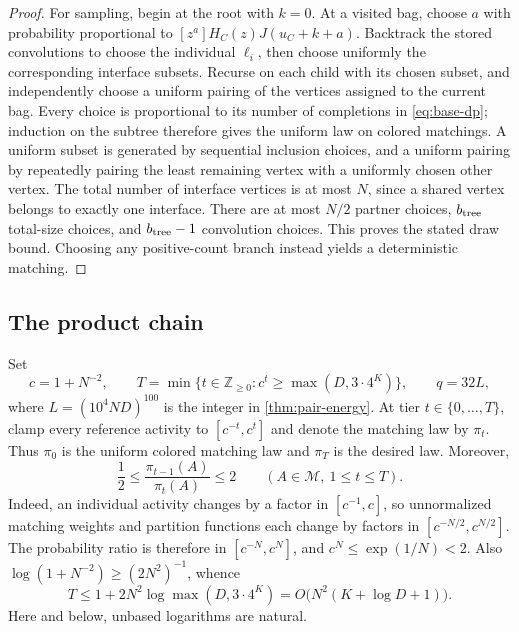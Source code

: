 \documentclass[11pt]{article}
\theoremstyle{definition}
\theoremstyle{remark}
\newcommand{\calM}{\mathcal M}
\numberwithin{equation}{section}
\begin{document}
\begin{proof}
For sampling, begin at the root with $k=0$. At a visited bag, choose
$a$ with probability proportional to $[z^a]H_C(z)J(u_C+k+a)$.
Backtrack the stored convolutions to choose the individual $\ell_i$,
then choose uniformly the corresponding interface subsets. Recurse
on each child with its chosen subset, and independently choose a
uniform pairing of the vertices assigned to the current bag. Every
choice is proportional to its number of completions in
\cref{eq:base-dp}; induction on the subtree therefore gives the
uniform law on colored matchings.
A uniform subset is generated by sequential inclusion choices, and a
uniform pairing by repeatedly pairing the least remaining vertex
with a uniformly chosen other vertex. The total number of interface
vertices is at most $N$, since a shared vertex belongs to exactly one
interface. There are at most $N/2$ partner choices, $b_{\rm tree}$ total-size
choices, and $b_{\rm tree}-1$ convolution choices. This proves the stated draw bound. Choosing any
positive-count branch instead yields a deterministic matching.
\end{proof}

\subsection{The product chain}

Set
\begin{equation}\label{eq:ladder-parameters}
 c=1+N^{-2},\qquad
 T=\min\{t\in\mathbb Z_{\ge0}:c^t\ge\max(D,3\cdot4^K)\},
 \qquad q=32L,
\end{equation}
where $L=(10^4ND)^{100}$ is the integer in
\cref{thm:pair-energy}. At tier $t\in\{0,\ldots,T\}$, clamp every
reference activity to $[c^{-t},c^t]$ and denote the matching law by
$\pi_t$. Thus $\pi_0$ is the uniform colored matching law and
$\pi_T$ is the desired law. Moreover,
\begin{equation}\label{eq:adjacent-density}
 \frac12\le\frac{\pi_{t-1}(A)}{\pi_t(A)}\le2
 \qquad(A\in\calM,\ 1\le t\le T).
\end{equation}
Indeed, an individual activity changes by a factor in $[c^{-1},c]$,
so unnormalized matching weights and partition functions each change
by factors in $[c^{-N/2},c^{N/2}]$. The probability ratio is therefore
in $[c^{-N},c^N]$, and
$c^N\le\exp(1/N)<2$.
Also $\log(1+N^{-2})\ge(2N^2)^{-1}$, whence
\begin{equation}\label{eq:ladder-tier-bound}
 T\le1+2N^2\log\max(D,3\cdot4^K)
   =O\bigl(N^2(K+\log D+1)\bigr).
\end{equation}
Here and below, unbased logarithms are natural.
\end{document}

